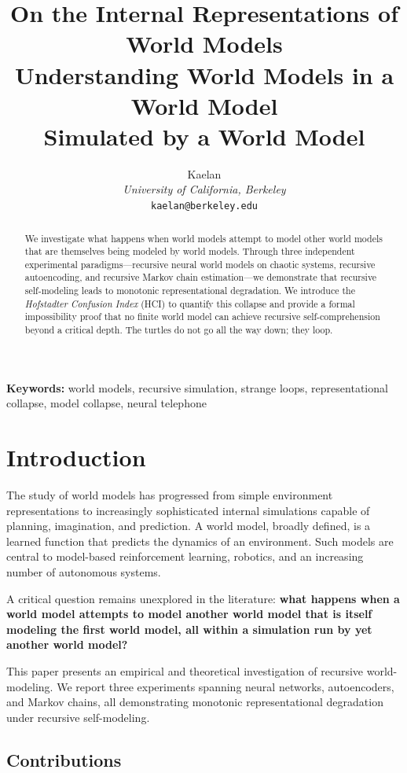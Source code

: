 \documentclass[11pt, twocolumn]{article}
\title{\textbf{On the Internal Representations of World Models\\ Understanding World Models in a World Model\\ Simulated by a World Model}}
\author{
    Kaelan\\
    \textit{University of California, Berkeley}\\
    \texttt{kaelan@berkeley.edu}
}
\date{}
\begin{document}
\maketitle

\begin{abstract}
We investigate what happens when world models attempt to model other world models that are themselves being modeled by world models. Through three independent experimental paradigms---recursive neural world models on chaotic systems, recursive autoencoding, and recursive Markov chain estimation---we demonstrate that recursive self-modeling leads to monotonic representational degradation. We introduce the \textit{Hofstadter Confusion Index} (HCI) to quantify this collapse and provide a formal impossibility proof that no finite world model can achieve recursive self-comprehension beyond a critical depth. The turtles do not go all the way down; they loop.
\end{abstract}

\textbf{Keywords:} world models, recursive simulation, strange loops, representational collapse, model collapse, neural telephone

\section{Introduction}

The study of world models has progressed from simple environment representations \cite{ha2018world} to increasingly sophisticated internal simulations capable of planning, imagination, and prediction. A world model, broadly defined, is a learned function that predicts the dynamics of an environment. Such models are central to model-based reinforcement learning, robotics, and an increasing number of autonomous systems.

A critical question remains unexplored in the literature: \textbf{what happens when a world model attempts to model another world model that is itself modeling the first world model, all within a simulation run by yet another world model?}

This paper presents an empirical and theoretical investigation of recursive world-modeling. We report three experiments spanning neural networks, autoencoders, and Markov chains, all demonstrating monotonic representational degradation under recursive self-modeling.

\subsection{Contributions}
\end{document}
